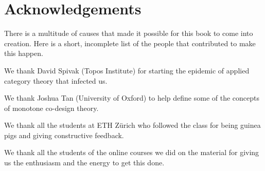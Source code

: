
\section{Acknowledgements}

There is a multitude of causes that made it possible for this book to come into creation.
Here is a short, incomplete list of the people that contributed to make this happen.

We thank David Spivak (Topos Institute) for starting the epidemic of applied category theory that infected us.

We thank Joshua Tan (University of Oxford) to help define some of the concepts of monotone co-design theory.

We thank all the students at ETH Zürich who followed the class for being guinea pigs and giving constructive feedback.

We thank all the students of the online courses we did on the material for giving us the enthusiasm and the energy to get this done.


